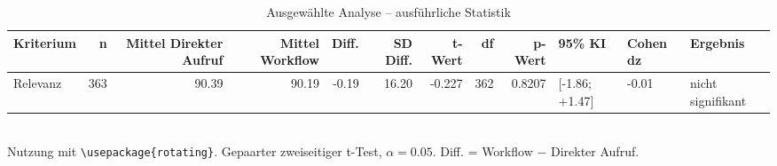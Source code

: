 \begin{table}
\centering
\caption{Ausgewählte Analyse -- ausführliche Statistik}
\begin{tabular}{lrrrrrrrrlll}
\toprule
Kriterium & n & Mittel Direkter Aufruf & Mittel Workflow & Diff. & SD Diff. & t-Wert & df & p-Wert & 95\% KI & Cohen dz & Ergebnis \\
\midrule
Relevanz & 363 & 90.39 & 90.19 & -0.19 & 16.20 & -0.227 & 362 & 0.8207 & [-1.86; +1.47] & -0.01 & nicht signifikant \\
\bottomrule
\end{tabular}
\\[2mm]
\footnotesize Nutzung mit \texttt{\textbackslash usepackage\{rotating\}}. Gepaarter zweiseitiger t-Test, $\alpha=0.05$. Diff. = Workflow $-$ Direkter Aufruf.
\end{table}
